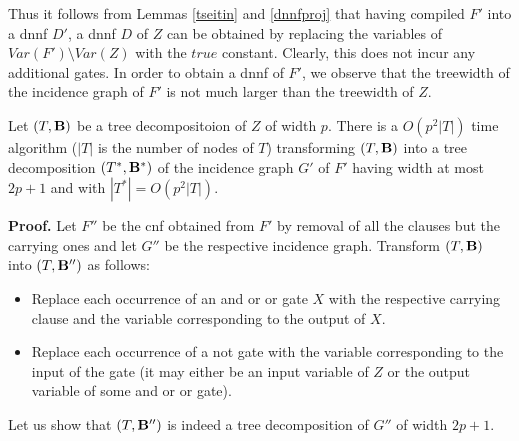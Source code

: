 \documentclass{llncs}
\begin{document}
Thus it follows from Lemmas \ref{tseitin} and \ref{dnnfproj} that having compiled $F'$ into a {\sc dnnf} $D'$,
a {\sc dnnf} $D$ of $Z$ can be obtained by replacing the variables of $Var(F') \setminus Var(Z)$ with the $true$
constant. Clearly, this does not incur any additional gates. In order to obtain a {\sc dnnf} of $F'$, we observe 
that the treewidth of the incidence graph of $F'$ is not much larger than the treewidth of $Z$.


\begin{lemma} \label{tseitindecomp}
Let $(T,{\bf B})$ be a tree decompositoion of $Z$ of width $p$.
There is a $O(p^2|T|)$ time algorithm ($|T|$ is the number of nodes of $T$) transforming
$(T,{\bf B})$ into a tree decomposition $(T^*,{\bf B^*})$ of the incidence graph $G'$ of 
$F'$ having width at most $2p+1$ and with $|T^*|=O(p^2|T|)$.
\end{lemma}

{\bf Proof.}
Let $F''$ be the {\sc cnf} obtained from $F'$ by removal of all the clauses but the carrying ones and let $G''$
be the respective incidence graph. Transform $(T,{\bf B})$ into $(T,{\bf B''})$ as follows:
\begin{itemize}
\item Replace each occurrence of an {\sc and} or {\sc or} gate $X$ with the respective carrying clause and the
      variable corresponding to the output of $X$.
\item Replace each occurrence of a {\sc not} gate with the variable corresponding to the input of the gate
      (it may either be an input variable of $Z$ or the output variable of some {\sc and} or {\sc or} gate).			
\end{itemize}
Let us show that $(T,{\bf B''})$ is indeed a tree decomposition 
of $G''$ of width $2p+1$.
\end{document}

